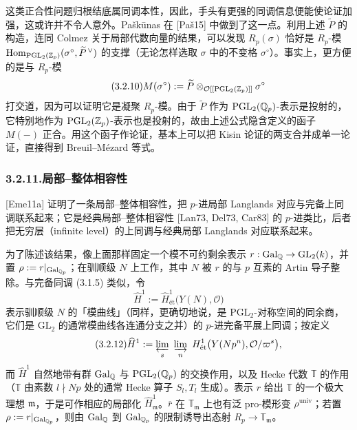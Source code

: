 这类正合性问题归根结底属同调本性，因此，手头有更强的同调信息便能使论证加强，这或许并不令人意外。Paškūnas 在 [Paš15] 中做到了这一点。利用上述 $\widetilde P$ 的构造，连同 Colmez 关于局部代数向量的结果，可以发现 $R_p(\sigma)$ 恰好是 $R_p$-模 $\operatorname{Hom}_{\mathrm{PGL}_2(\mathbb{Z}_p)}(\sigma^{\circ},\widetilde P^{\,\vee})$ 的支撑（无论怎样选取 $\sigma$ 中的不变格 $\sigma^{\circ}$）。事实上，更方便的是与 $R_p$-模
\begin{equation}\tag{3.2.10}\label{eq:a4-3-2-10}
M(\sigma^{\circ}):=\widetilde P\otimes_{\mathcal O[[\mathrm{PGL}_2(\mathbb{Z}_p)]]}\sigma^{\circ}
\end{equation}
打交道，因为可以证明它是凝聚 $R_p$-模。由于 $\widetilde P$ 作为 $\mathrm{PGL}_2(\mathbb{Q}_p)$-表示是投射的，它特别地作为 $\mathrm{PGL}_2(\mathbb{Z}_p)$-表示也是投射的，故由上述公式隐含定义的函子 $M(-)$ 正合。用这个函子作论证，基本上可以把 Kisin 论证的两支合并成单一论证，直接得到 Breuil--Mézard 等式。

\subsubsection*{3.2.11.\quad 局部--整体相容性}

[Eme11a] 证明了一条局部--整体相容性，把 $p$-进局部 Langlands 对应与完备上同调联系起来；它是经典局部--整体相容性 [Lan73, Del73, Car83] 的 $p$-进类比，后者把无穷层（infinite level）的上同调与经典局部 Langlands 对应联系起来。

为了陈述该结果，像上面那样固定一个模不可约剩余表示 $r:\operatorname{Gal}_{\mathbb{Q}}\to\mathrm{GL}_2(k)$，并置 $\rho:=r|_{\operatorname{Gal}_{\mathbb{Q}_p}}$；在驯顺级 $N$ 上工作，其中 $N$ 被 $r$ 的与 $p$ 互素的 Artin 导子整除。与完备同调 (3.1.5) 类似，令
\[
\widehat H^1:=\widehat H^1_{\text{ét}}\bigl(Y(N),\mathcal O\bigr)
\]
表示驯顺级 $N$ 的「模曲线」（同样，更确切地说，是 $\mathrm{PGL}_2$-对称空间的同余商，它们是 $\mathrm{GL}_2$ 的通常模曲线各连通分支之并）的 $p$-进完备平展上同调；按定义
\begin{equation}\tag{3.2.12}\label{eq:a4-3-2-12}
\widehat H^1:=\varprojlim_{s}\ \varinjlim_{n}\ H^1_{\text{ét}}\bigl(Y(Np^n),\mathcal O/\varpi^s\bigr),
\end{equation}
而 $\widehat H^1$ 自然地带有群 $\operatorname{Gal}_{\mathbb{Q}}$ 与 $\mathrm{PGL}_2(\mathbb{Q}_p)$ 的交换作用，以及 Hecke 代数 $\mathbb T$ 的作用（$\mathbb T$ 由素数 $l\nmid Np$ 处的通常 Hecke 算子 $S_l,T_l$ 生成）。表示 $r$ 给出 $\mathbb T$ 的一个极大理想 $\mathfrak m$，于是可作相应的局部化 $\widehat H^1_{\mathfrak m}$。$\overline{r}$ 在 $\mathbb T_{\mathfrak m}$ 上也有泛 pro-模形变 $\rho^{\mathrm{univ}}$；若置 $\rho:=r|_{\operatorname{Gal}_{\mathbb{Q}_p}}$，则由 $\operatorname{Gal}_{\mathbb{Q}}$ 到 $\operatorname{Gal}_{\mathbb{Q}_p}$ 的限制诱导出态射 $R_p\to\mathbb T_{\mathfrak m}$。

